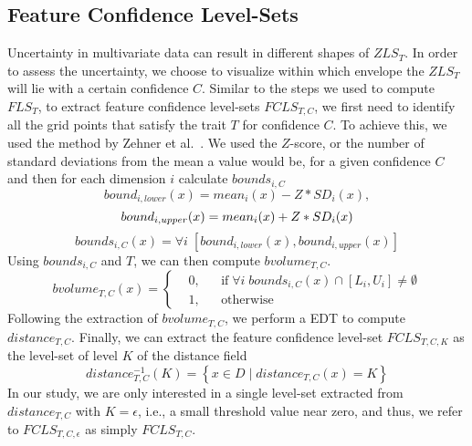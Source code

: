 \subsection{Feature Confidence Level-Sets}
Uncertainty in multivariate data can result in different shapes of $ZLS_{T}$.
%
In order to assess the uncertainty, we choose to visualize within which envelope the $ZLS_{T}$ will lie with a certain confidence $C$.
%
Similar to the steps we used to compute $FLS_{T}$, to extract feature confidence level-sets $FCLS_{T,C}$, we first need to identify all the grid points that satisfy the trait $T$ for confidence $C$.
%
To achieve this, we used the method by Zehner et al.~\cite{zehner2010visualization}. 
%
We used the $Z$-score, or the number of standard deviations from the mean a value would be, for a given confidence $C$ and then for each dimension $i$ calculate $bounds_{i,C}$
\begin{equation}
bound_{i,lower}(x) = mean_{i}(x) - Z*SD_{i}(x),
\end{equation}
\begin{equation}
bound_{i,upper}(x) = mean_{i}(x) + Z*SD_{i}(x)\\
\end{equation}
\begin{equation}
bounds_{i,C}(x) = \forall i \; [bound_{i, lower}(x), bound_{i,upper}(x)]
\end{equation}
%
Using $bounds_{i,C}$ and $T$, we can then compute $bvolume_{T,C}$.
\begin{equation}
  bvolume_{T,C}(x) = \left \{
  \begin{aligned}
    &0, && \text{if}\; \forall i\; bounds_{i, C}(x) \cap [L_{i}, U_{i}] \neq \emptyset \\
    &1, && \text{otherwise}
  \end{aligned} \right.
\end{equation}
%
Following the extraction of $bvolume_{T,C}$, we perform a EDT to compute $distance_{T,C}$.
%
Finally, we can extract the feature confidence level-set $FCLS_{T,C,K}$ as the level-set of level $K$ of the distance field
%
\begin{equation} 
distance_{T,C}^{-1}(K) = \left\{ x \in D\; |\; distance_{T,C}(x) = K\right\}
\end{equation}
%
In our study, we are only interested in a single level-set extracted from $distance_{T,C}$ with $K = \epsilon$, i.e., a small threshold value near zero, and thus, we refer to $FCLS_{T,C,\epsilon}$ as simply $FCLS_{T,C}$.

